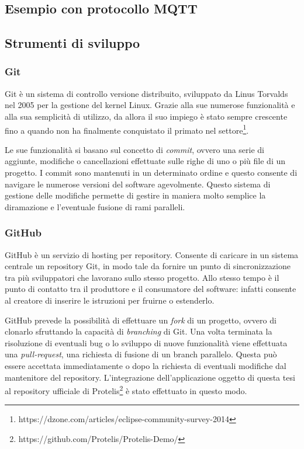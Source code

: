 \subsection{Esempio con protocollo MQTT}

\subsection{Strumenti di sviluppo}

\subsubsection{Git}
Git è un sistema di controllo versione distribuito, sviluppato da Linus Torvalds
nel 2005 per la gestione del kernel Linux. Grazie alla sue numerose funzionalità
e alla sua semplicità di utilizzo, da allora il suo impiego è stato sempre
crescente fino a quando non ha finalmente conquistato il primato nel
settore\footnote{https://dzone.com/articles/eclipse-community-survey-2014}.

Le sue funzionalità si basano sul concetto di \textit{commit}, ovvero una serie
di aggiunte, modifiche o cancellazioni effettuate sulle righe di uno o più file
di un progetto. I commit sono mantenuti in un determinato ordine e questo
consente di navigare le numerose versioni del software agevolmente. Questo
sistema di gestione delle modifiche permette di gestire in maniera molto
semplice la diramazione e l'eventuale fusione di rami paralleli.

\subsubsection{GitHub}
GitHub è un servizio di hosting per repository. Consente di caricare in un
sistema centrale un repository Git, in modo tale da fornire un punto di
sincronizzazione tra più sviluppatori che lavorano sullo stesso progetto. Allo
stesso tempo è il punto di contatto tra il produttore e il consumatore del
software: infatti consente al creatore di inserire le istruzioni per fruirne o
estenderlo.

GitHub prevede la possibilità di effettuare un \textit{fork} di un
progetto, ovvero di clonarlo sfruttando la capacità di
\textit{branching} di Git. Una volta terminata la risoluzione di
eventuali bug o lo sviluppo di nuove funzionalità viene effettuata una
\textit{pull-request}, una richiesta di fusione di un branch
parallelo. Questa può essere accettata immediatamente o dopo la
richiesta di eventuali modifiche dal mantenitore del repository.
L'integrazione dell'applicazione oggetto di questa tesi al repository
ufficiale di
Protelis\footnote{https://github.com/Protelis/Protelis-Demo/} è stato
effettuato in questo modo.

